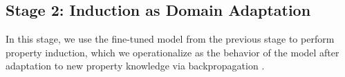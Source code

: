 \documentclass[10pt,letterpaper]{article}
\begin{document}
\subsection{Stage 2: Induction as Domain Adaptation}
In this stage, we use the fine-tuned model from the previous stage to perform property induction, which we operationalize as the behavior of the model after adaptation to new property knowledge via backpropagation \citep{rumelhart1986learning}.
\end{document}
